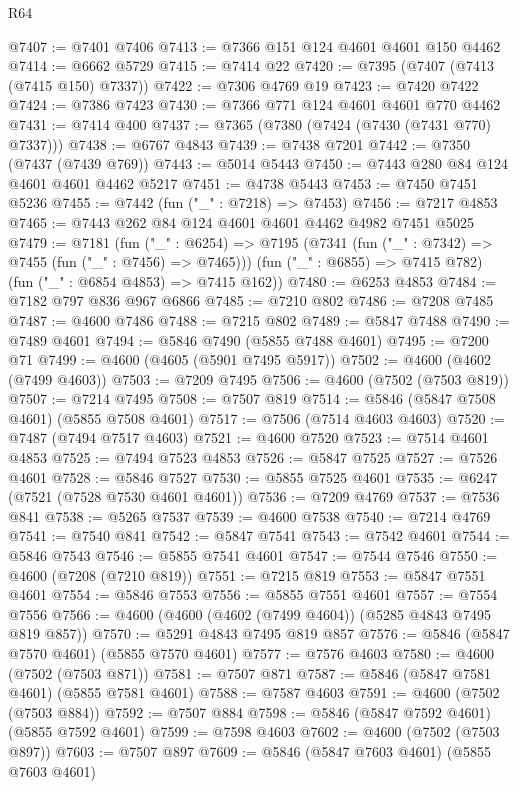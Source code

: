 \begin{lexlean}{R64}
\begin{coremodule}
@7407 := @7401 @7406
@7413 := @7366 @151 @124 @4601 @4601 @150 @4462
@7414 := @6662 @5729
@7415 := @7414 @22
@7420 := @7395 (@7407 (@7413 (@7415 @150) @7337))
@7422 := @7306 @4769 @19
@7423 := @7420 @7422
@7424 := @7386 @7423
@7430 := @7366 @771 @124 @4601 @4601 @770 @4462
@7431 := @7414 @400
@7437 := @7365 (@7380 (@7424 (@7430 (@7431 @770) @7337)))
@7438 := @6767 @4843
@7439 := @7438 @7201
@7442 := @7350 (@7437 (@7439 @769))
@7443 := @5014 @5443
@7450 := @7443 @280 @84 @124 @4601 @4601 @4462 @5217
@7451 := @4738 @5443
@7453 := @7450 @7451 @5236
@7455 := @7442 (fun ("_" : @7218) => @7453)
@7456 := @7217 @4853
@7465 := @7443 @262 @84 @124 @4601 @4601 @4462 @4982 @7451 @5025
@7479 := @7181
    (fun ("_" : @6254) =>
    @7195
      (@7341 (fun ("_" : @7342) => @7455 (fun ("_" : @7456) => @7465)))
      (fun ("_" : @6855) => @7415 @782)
      (fun ("_" : @6854 @4853) => @7415 @162))
@7480 := @6253 @4853
@7484 := @7182 @797 @836 @967 @6866
@7485 := @7210 @802
@7486 := @7208 @7485
@7487 := @4600 @7486
@7488 := @7215 @802
@7489 := @5847 @7488
@7490 := @7489 @4601
@7494 := @5846 @7490 (@5855 @7488 @4601)
@7495 := @7200 @71
@7499 := @4600 (@4605 (@5901 @7495 @5917))
@7502 := @4600 (@4602 (@7499 @4603))
@7503 := @7209 @7495
@7506 := @4600 (@7502 (@7503 @819))
@7507 := @7214 @7495
@7508 := @7507 @819
@7514 := @5846 (@5847 @7508 @4601) (@5855 @7508 @4601)
@7517 := @7506 (@7514 @4603 @4603)
@7520 := @7487 (@7494 @7517 @4603)
@7521 := @4600 @7520
@7523 := @7514 @4601 @4853
@7525 := @7494 @7523 @4853
@7526 := @5847 @7525
@7527 := @7526 @4601
@7528 := @5846 @7527
@7530 := @5855 @7525 @4601
@7535 := @6247 (@7521 (@7528 @7530 @4601 @4601))
@7536 := @7209 @4769
@7537 := @7536 @841
@7538 := @5265 @7537
@7539 := @4600 @7538
@7540 := @7214 @4769
@7541 := @7540 @841
@7542 := @5847 @7541
@7543 := @7542 @4601
@7544 := @5846 @7543
@7546 := @5855 @7541 @4601
@7547 := @7544 @7546
@7550 := @4600 (@7208 (@7210 @819))
@7551 := @7215 @819
@7553 := @5847 @7551 @4601
@7554 := @5846 @7553
@7556 := @5855 @7551 @4601
@7557 := @7554 @7556
@7566 := @4600 (@4600 (@4602 (@7499 @4604)) (@5285 @4843 @7495 @819 @857))
@7570 := @5291 @4843 @7495 @819 @857
@7576 := @5846 (@5847 @7570 @4601) (@5855 @7570 @4601)
@7577 := @7576 @4603
@7580 := @4600 (@7502 (@7503 @871))
@7581 := @7507 @871
@7587 := @5846 (@5847 @7581 @4601) (@5855 @7581 @4601)
@7588 := @7587 @4603
@7591 := @4600 (@7502 (@7503 @884))
@7592 := @7507 @884
@7598 := @5846 (@5847 @7592 @4601) (@5855 @7592 @4601)
@7599 := @7598 @4603
@7602 := @4600 (@7502 (@7503 @897))
@7603 := @7507 @897
@7609 := @5846 (@5847 @7603 @4601) (@5855 @7603 @4601)

\end{coremodule}
\end{lexlean}
